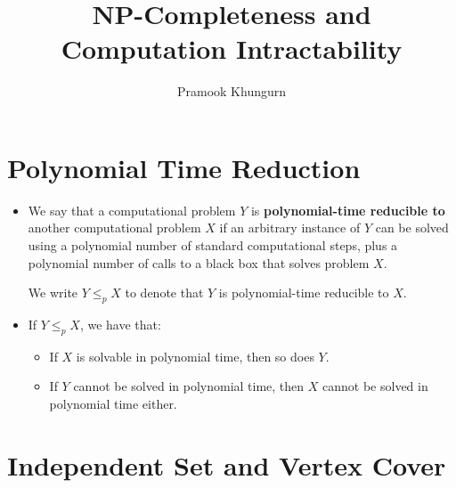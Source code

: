 \documentclass[10pt]{article}
\title{NP-Completeness and Computation Intractability}
\author{Pramook Khungurn}
\begin{document}
	\maketitle

  \section{Polynomial Time Reduction} %
  \label{sec:polynomial_time_reduction}
  \begin{itemize}
    \item We say that a computational problem $Y$ is {\bf polynomial-time reducible to}
      another computational problem $X$ if an arbitrary instance of $Y$ can be solved
      using a polynomial number of standard computational steps, plus a polynomial number
      of calls to a black box that solves problem $X$.
      
      We write $Y \leq_p X$ to denote that $Y$ is polynomial-time reducible to $X$.
      
    \item If $Y \leq_p X$, we have that:
      \begin{itemize}
        \item If $X$ is solvable in polynomial time, then so does $Y$.
        \item If $Y$ cannot be solved in polynomial time, then $X$ cannot be solved in polynomial time either.
      \end{itemize}
  \end{itemize}
  
  \section{Independent Set and Vertex Cover} %
  \label{sec:independent_set_and_vertex_cover}
  
\end{document}
